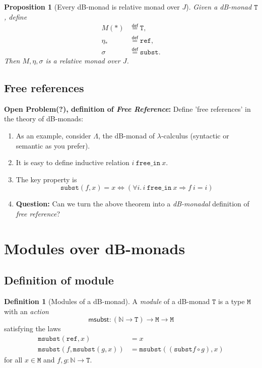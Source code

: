 \documentclass[a4paper,twoside,12pt]{article}
\newtheorem{proposition}{Proposition}
\theoremstyle{definition}
\newtheorem{definition}{Definition}
\theoremstyle{remark}
\newcommand{\NN}{\mathbb{N}}
\newcommand{\subst}{\mathtt{subst}}
\newcommand{\refe}{\mathtt{ref}}
\newcommand{\TT}{\mathtt{T}}
\newcommand{\MM}{\mathtt{M}}
\newcommand{\msubst}{\mathtt{msubst}}
\begin{document}
\begin{proposition}[Every dB-monad is relative monad over $J$]
  Given a dB-monad $\TT$, define
  \begin{align*}
    M(*) &\stackrel{\mathsf{def}}{=} \TT, \\
    \eta_* &\stackrel{\mathsf{def}}{=} \refe, \\
    \sigma &\stackrel{\mathsf{def}}{=} \subst.
  \end{align*}
  Then $M,\eta,\sigma$ is a relative monad over $J$.
\end{proposition}

\subsection{Free references}
\label{sec:free-references}

\textbf{Open Problem(?), definition of \emph{Free Reference}:}
Define 'free references' in the theory of dB-monads:
\begin{enumerate}
\item As an example, consider $\Lambda$, the dB-monad of
  $\lambda$-calculus (syntactic or semantic as you prefer).
\item It is easy to define inductive relation
  $i\ \mathtt{free\_in}\ x$.
\item The key property is
  \begin{equation*}
    \subst(f,x) = x \Longleftrightarrow
    (\forall i.\, i\ \mathtt{free\_in}\ x \Longrightarrow f\ i = i)
  \end{equation*}
\item \textbf{Question:} Can we turn the above theorem into a
  \emph{dB-monadal} definition of \emph{free reference}?
\end{enumerate}

\section{Modules over dB-monads}
\label{sec:modules}

\subsection{Definition of module}
\label{sec:definition-module}

\begin{definition}[Modules of a dB-monad]
  A \emph{module} of a dB-monad $\TT$ is a type $\MM$ with an
  \emph{action}
  \begin{equation*}
    \mathsf{msubst}\colon (\NN\to \TT) \to \MM \to \MM
  \end{equation*}
  satisfying the laws
  \begin{align*}
    \msubst(\refe,x) &= x\\
    \msubst(f,\msubst(g,x)) &= \msubst((\subst f \circ g), x)
  \end{align*}
  for all $x\in \MM$ and $f,g\colon \NN \to \TT$.
\end{definition}
\end{document}
